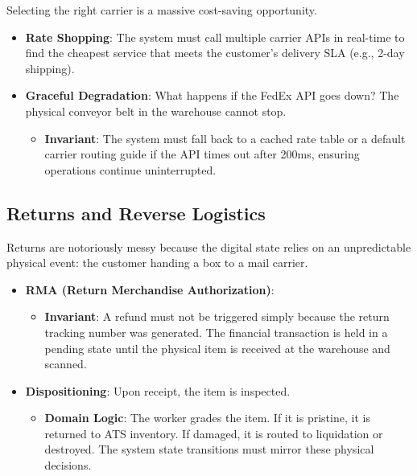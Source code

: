 \documentclass[
  11pt,
  openany,
  oneside]{book}
\providecommand{\tightlist}{%
  \setlength{\itemsep}{0pt}\setlength{\parskip}{0pt}}
\begin{document}
Selecting the right carrier is a massive cost-saving opportunity.

\begin{itemize}
\tightlist
\item
  \textbf{Rate Shopping}: The system must call multiple carrier APIs in
  real-time to find the cheapest service that meets the customer's
  delivery SLA (e.g., 2-day shipping).
\item
  \textbf{Graceful Degradation}: What happens if the FedEx API goes
  down? The physical conveyor belt in the warehouse cannot stop.

  \begin{itemize}
  \tightlist
  \item
    \textbf{Invariant}: The system must fall back to a cached rate table
    or a default carrier routing guide if the API times out after 200ms,
    ensuring operations continue uninterrupted.
  \end{itemize}
\end{itemize}

\subsection{Returns and Reverse
Logistics}\label{returns-and-reverse-logistics}

Returns are notoriously messy because the digital state relies on an
unpredictable physical event: the customer handing a box to a mail
carrier.

\begin{itemize}
\tightlist
\item
  \textbf{RMA (Return Merchandise Authorization)}:

  \begin{itemize}
  \tightlist
  \item
    \textbf{Invariant}: A refund must not be triggered simply because
    the return tracking number was generated. The financial transaction
    is held in a pending state until the physical item is received at
    the warehouse and scanned.
  \end{itemize}
\item
  \textbf{Dispositioning}: Upon receipt, the item is inspected.

  \begin{itemize}
  \tightlist
  \item
    \textbf{Domain Logic}: The worker grades the item. If it is
    pristine, it is returned to ATS inventory. If damaged, it is routed
    to liquidation or destroyed. The system state transitions must
    mirror these physical decisions.
  \end{itemize}
\end{itemize}
\end{document}
